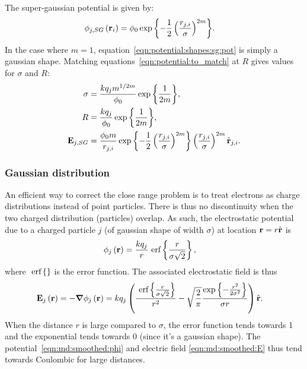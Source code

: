 The super-gaussian potential is given by:
\begin{align}
\phi_{j,SG}\left( \textbf{r}_i \right) & = \phi_0 \exp{ \left\{ 
                            -\frac{1}{2} \left( \frac{r_{j,i}}{\sigma} \right)^{2m}
                         \right\}}.
\label{eqn:potential:shapes:sg:pot}
\end{align}
In the case where $m = 1$, equation~\eqref{eqn:potential:shapes:sg:pot} is simply
a gaussian shape. Matching equations~\eqref{eqn:potential:to_match} at $R$ gives
values for $\sigma$ and $R$:
\begin{subequations}
\begin{align}
\sigma  & = \frac{k q_j m^{1/2m}}{\phi_0} \exp{ \left\{ \frac{1}{2m} \right\}}, \\
R       & = \frac{k q_j}{\phi_0} \exp{ \left\{ \frac{1}{2m} \right\}}, \\
\textbf{E}_{j,SG} & = \frac{\phi_0 m}{r_{j,i}}
                \exp{ \left\{ -\frac{1}{2} \left( \frac{r_{j,i}}{\sigma} \right)^{2m} \right\}}
                \left(  \frac{r_{j,i}}{\sigma}  \right)^{2m}
                \hat{\textbf{r}}_{j,i}.
\end{align}
\label{eqn:potential:shapes:sg}
\end{subequations}





\subsubsection{Gaussian distribution}

An efficient way to correct the close range problem is to treat electrons as
charge distributions instead of point particles. There is thus no
discontinuity when the two charged distribution (particles) overlap. As such,
the electrostatic potential due to a charged particle $j$
(of gaussian shape of width $\sigma$) at location $\textbf{r} = r \hat{\textbf{r}}$ is
\begin{align}
\phi_{j}\left( \textbf{r} \right) & = \frac{k q_j}{r} ~\textrm{erf} \left\{\frac{r}{\sigma \sqrt{2}}\right\},
\label{eqn:md:smoothed:phi}
\end{align}
where $~\textrm{erf} \left\{\right\}$ is the error function. The associated electrostatic field is thus
\begin{align}
\textbf{E}_{j}\left( \textbf{r} \right) & = -\bm{\nabla} \phi_j\left( \textbf{r} \right) = k q_j \left( 
    \frac{ ~\textrm{erf} \left\{\frac{r}{\sigma\sqrt{2}}\right\} }{r^2}
    - \sqrt{\frac{2}{\pi}} \frac{ \exp{ \left\{ -\frac{r^2}{2 \sigma^2} \right\}} }{\sigma r}
 \right) \hat{\textbf{r}}.
\label{eqn:md:smoothed:E}
\end{align}
When the distance $r$ is large compared to $\sigma$, the error function
tends towards 1 and the exponential tends towards 0 (since it's a gaussian
shape). The potential~\eqref{eqn:md:smoothed:phi} and electric field
\eqref{eqn:md:smoothed:E} thus tend towards Coulombic for large distances.

